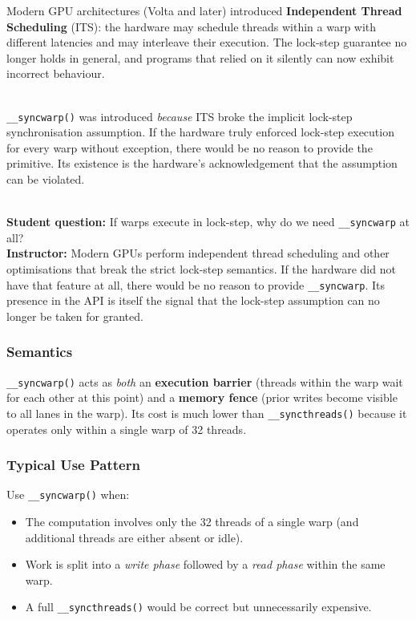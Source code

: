 Modern GPU architectures (Volta and later) introduced \textbf{Independent
Thread Scheduling} (ITS): the hardware may schedule threads within a warp with
different latencies and may interleave their execution. The lock-step guarantee
no longer holds in general, and programs that relied on it silently can now
exhibit incorrect behaviour.

\begin{ppkey}
  \\\texttt{\_\_syncwarp()} was introduced \emph{because} ITS broke the implicit
  lock-step synchronisation assumption. If the hardware truly enforced lock-step
  execution for every warp without exception, there would be no reason to
  provide the primitive. Its existence is the hardware's acknowledgement that
  the assumption can be violated.
\end{ppkey}

\begin{ppnote}
  \\\textbf{Student question:} If warps execute in lock-step, why do we need
  \texttt{\_\_syncwarp} at all?\\[4pt]
  \textbf{Instructor:} Modern GPUs perform independent thread scheduling and
  other optimisations that break the strict lock-step semantics. If the hardware
  did not have that feature at all, there would be no reason to provide
  \texttt{\_\_syncwarp}. Its presence in the API is itself the signal that the
  lock-step assumption can no longer be taken for granted.
\end{ppnote}

\subsubsection{Semantics}

\texttt{\_\_syncwarp()} acts as \emph{both} an \textbf{execution barrier}
(threads within the warp wait for each other at this point) and a
\textbf{memory fence} (prior writes become visible to all lanes in the warp).
Its cost is much lower than \texttt{\_\_syncthreads()} because it operates
only within a single warp of 32 threads.

\subsubsection{Typical Use Pattern}

Use \texttt{\_\_syncwarp()} when:
\begin{itemize}[noitemsep]
  \item The computation involves only the 32 threads of a single warp (and
        additional threads are either absent or idle).
  \item Work is split into a \emph{write phase} followed by a \emph{read
        phase} within the same warp.
  \item A full \texttt{\_\_syncthreads()} would be correct but unnecessarily
        expensive.
\end{itemize}

